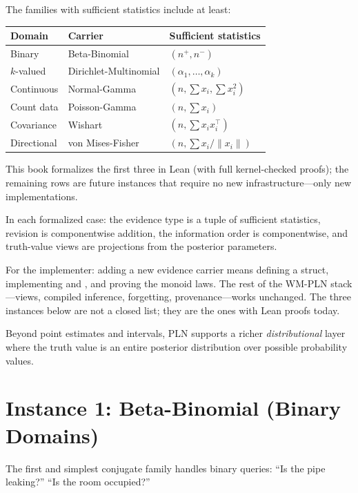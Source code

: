 \documentclass[11pt,openany]{report}
\begin{document}
The families with sufficient statistics include at least:

\begin{center}
\begin{tabular}{lll}
\textbf{Domain} & \textbf{Carrier} & \textbf{Sufficient statistics} \\
\hline
Binary       & Beta-Binomial      & $(n^+, n^-)$ \\
$k$-valued   & Dirichlet-Multinomial & $(\alpha_1, \ldots, \alpha_k)$ \\
Continuous   & Normal-Gamma       & $(n, \sum x_i, \sum x_i^2)$ \\
Count data   & Poisson-Gamma      & $(n, \sum x_i)$ \\
Covariance   & Wishart            & $(n, \sum x_i x_i^\top)$ \\
Directional  & von Mises-Fisher   & $(n, \sum x_i / \|x_i\|)$ \\
\end{tabular}
\end{center}

\noindent
This book formalizes the first three in Lean (with full kernel-checked
proofs); the remaining rows are future instances that require no new
infrastructure---only new  implementations.

In each formalized case: the evidence type is a tuple of sufficient
statistics, revision is componentwise addition, the information order is
componentwise, and truth-value views are projections from the posterior
parameters.

For the implementer: adding a new evidence carrier means defining a
struct, implementing  and , and proving the monoid
laws.  The rest of the WM-PLN stack---views, compiled inference,
forgetting, provenance---works unchanged.  The three instances below are
not a closed list; they are the ones with Lean proofs today.

Beyond point estimates and intervals, PLN supports a richer
\emph{distributional} layer where the truth value is an entire
posterior distribution over possible probability values.

\section{Instance 1: Beta-Binomial (Binary Domains)}

The first and simplest conjugate family handles binary queries: ``Is
the pipe leaking?'' ``Is the room occupied?''
\end{document}
